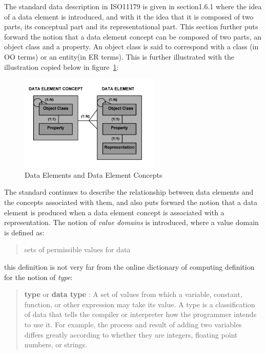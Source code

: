\documentclass{llncs}
\begin{document}
The standard data description in ISO11179 is given in section1.6.1 where the idea of a data element is introduced, and with it the idea that it is composed of two parts, its conceptual part and its representational part. This section further puts forward the notion that a data element concept can be composed of two parts, an object class and a property. An object class is said to correspond with a class (in OO terms) or an entity(in ER terms). This is further illustrated with the illustration copied below in figure~\ref{fig:DEC}:

\begin{figure}[h]
\includegraphics[width=0.6\textwidth,natwidth=610,natheight=642]{figs/DataElementConcept}
\caption{Data Elements and Data Element Concepts} 
\label{fig:DEC}
\end{figure}

The standard continues to describe the relationship between data elements and the concepts associated with them, and also puts forward the notion that a data element is produced when a data element concept is associated with a representation. The notion of \emph{value domains} is introduced, where a value domain is defined as:

\begin{quotation} {sets of permissible values for data} \end{quotation}

  this definition is not very far from the online dictionary of computing definition for the notion of \emph{type}: 
\begin{quotation}
\textbf{type} or \textbf{data type} : A set of values from which a variable, constant, function, or other expression may take its value. A type is a classification of data that tells the compiler or interpreter how the programmer intends to use it. For example, the process and result of adding two variables differs greatly according to whether they are integers, floating point numbers, or strings. 
\end{quotation}
\end{document}
